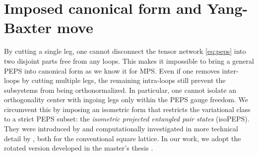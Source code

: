 \section{Imposed canonical form and Yang-Baxter move} \label{sec:canonical_form_yb}
By cutting a single leg, one cannot disconnect the tensor network \eqref{eq:peps} into two disjoint parts free from any loops. This makes it impossible to bring a general PEPS into canonical form as we know it for MPS. Even if one removes inter-loops by cutting multiple legs, the remaining intra-loops still prevent the subsystems from being orthonormalized. In particular, one cannot isolate an orthogonality center with ingoing legs only within the PEPS gauge freedom. We circumvent this by imposing an isometric form that restricts the variational class to a strict PEPS subset: the \textit{isometric projected entangled pair states} (isoPEPS). They were introduced by \cite{zaletel2020isometric} and computationally investigated in more technical detail by \cite{lin2022efficient}, both for the conventional square lattice. In our work, we adopt the rotated version developed in the master's thesis \cite{sappler2024diagonal, sappler2025diagonal}. \\[0.5em]

